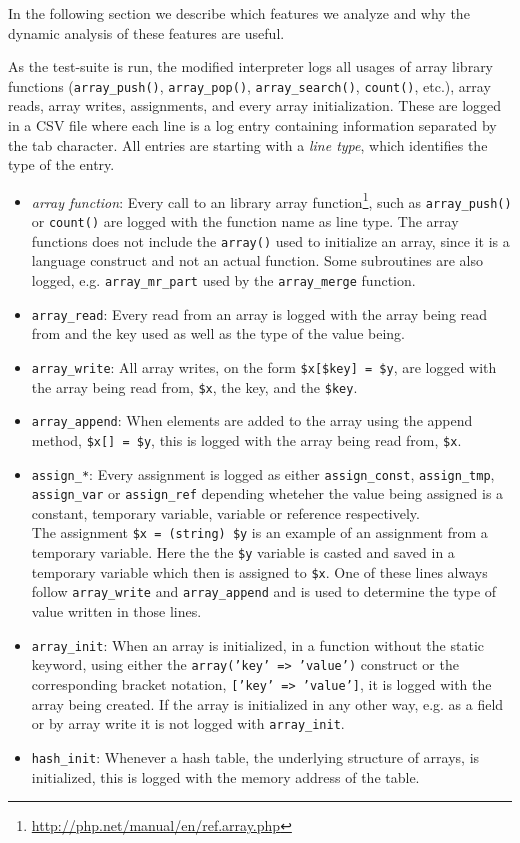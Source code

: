 In the following section we describe which features we analyze and why the dynamic analysis of these features are useful.

As the test-suite is run, the modified interpreter logs all usages of array library functions (\texttt{array\_push()}, \texttt{array\_pop()}, \texttt{array\_search()}, \texttt{count()}, etc.), array reads, array writes, assignments, and every array initialization. These are logged in a CSV file where each line is a log entry containing information separated by the tab character. All entries are starting with a \emph{line type}, which identifies the type of the entry.

\begin{itemize}
\item \emph{array function}: Every call to an library array function\footnote{\url{http://php.net/manual/en/ref.array.php}}, such as \texttt{array\_push()} or \texttt{count()} are logged with the function name as line type. The array functions does not include the \texttt{array()} used to initialize an array, since it is a language construct and not an actual function. Some subroutines are also logged, e.g. \texttt{array\_mr\_part} used by the \texttt{array\_merge} function.
\item \texttt{array\_read}: Every read from an array is logged with the array being read from and the key used as well as the type of the value being.
\item \texttt{array\_write}: All array writes, on the form \texttt{\$x[\$key] = \$y}, are logged with the array being read from, \texttt{\$x}, the key, and the \texttt{\$key}. 
\item \texttt{array\_append}: When elements are added to the array using the append method, \texttt{\$x[] = \$y}, this is logged with the array being read from, \texttt{\$x}.
\item \texttt{assign\_*}: Every assignment is logged as either \texttt{assign\_const}, \texttt{assign\_tmp}, \texttt{assign\_var} or \texttt{assign\_ref} depending wheteher the value being assigned is a constant, temporary variable, variable or reference respectively.\\
The assignment \texttt{\$x = (string) \$y} is an example of an assignment from a temporary variable. Here the the \texttt{\$y} variable is casted and saved in a temporary variable which then is assigned to \texttt{\$x}. One of these lines always follow \texttt{array\_write} and \texttt{array\_append} and is used to determine the type of value written in those lines.
\item \texttt{array\_init}: When an array is initialized, in a function without the static keyword, using either the \texttt{array('key' => 'value')} construct or the corresponding bracket notation, \texttt{['key' => 'value']}, it is logged with the array being created. If the array is initialized in any other way, e.g. as a field or by array write it is not logged with \texttt{array\_init}.
\item \texttt{hash\_init}: Whenever a hash table, the underlying structure of arrays, is initialized, this is logged with the memory address of the table.
\end{itemize}

